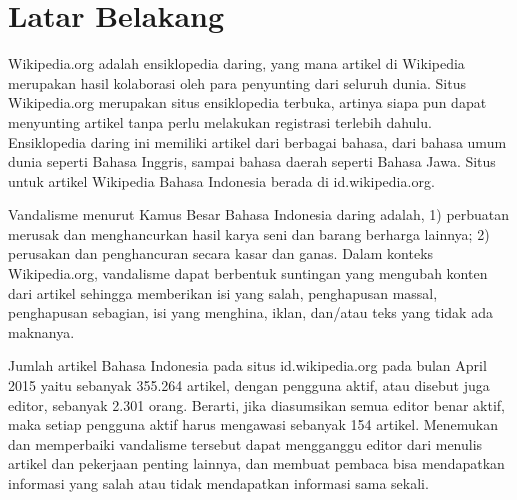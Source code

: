 \section{Latar Belakang}\label{sec:latar-belakang}

Wikipedia.org adalah ensiklopedia daring, yang mana artikel di Wikipedia
merupakan hasil kolaborasi oleh para penyunting dari seluruh dunia. Situs
Wikipedia.org merupakan situs ensiklopedia terbuka, artinya siapa pun dapat
menyunting artikel tanpa perlu melakukan registrasi terlebih dahulu.
Ensiklopedia daring ini memiliki artikel dari berbagai bahasa, dari bahasa umum
dunia seperti Bahasa Inggris, sampai bahasa daerah seperti Bahasa Jawa. Situs
untuk artikel Wikipedia Bahasa Indonesia berada di id.wikipedia.org.

Vandalisme menurut Kamus Besar Bahasa Indonesia daring adalah, 1) perbuatan merusak dan menghancurkan hasil karya seni dan barang berharga lainnya; 2) perusakan dan penghancuran secara kasar dan ganas. Dalam konteks Wikipedia.org, vandalisme dapat berbentuk suntingan yang mengubah konten dari artikel sehingga memberikan isi yang salah, penghapusan massal, penghapusan sebagian, isi yang menghina, iklan, dan/atau teks yang tidak ada maknanya.

Jumlah artikel Bahasa Indonesia pada situs id.wikipedia.org pada bulan April
2015 yaitu sebanyak 355.264 artikel, dengan pengguna aktif, atau disebut juga
editor, sebanyak 2.301 orang. Berarti, jika diasumsikan semua editor benar
aktif, maka setiap pengguna aktif harus mengawasi sebanyak 154 artikel.
Menemukan dan memperbaiki vandalisme tersebut dapat mengganggu editor dari
menulis artikel dan pekerjaan penting lainnya, dan membuat pembaca bisa
mendapatkan informasi yang salah atau tidak mendapatkan informasi
sama sekali.